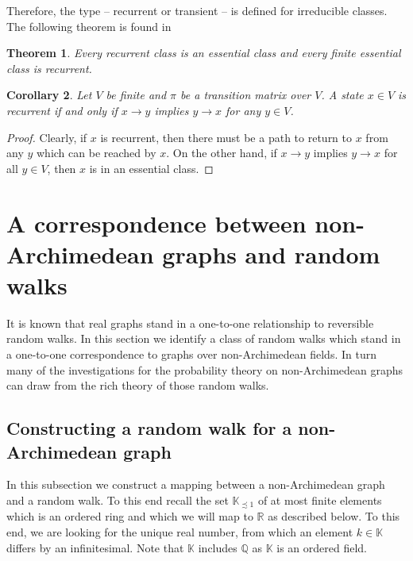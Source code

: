 \documentclass[a4paper,oneside, 12pt]{amsart}
\newtheorem{theorem}{Theorem}
\numberwithin{theorem}{section}
\newtheorem{corollary}[theorem]{Corollary}
\theoremstyle{definition}
\newcommand{\K}{\mathbb{K}}
\newcommand{\Kf}{\mathbb K_{\precsim 1}}
\newcommand{\prob}{\pi}
\begin{document}
{Therefore, the type -- recurrent or transient -- is defined for irreducible classes. The following theorem is found in \cite[3.4. Theorem (b) and (c)]{Woess09}

\begin{theorem}\label{lem:recvsess}
 Every
recurrent class is an essential class and 
every finite essential class is recurrent.
\end{theorem}



\begin{corollary}
Let  $ V $ be finite and $\prob$ be a transition matrix over $V$. A state $x\in V$  is recurrent if and only if  $x\to y$ implies $y\to x$ for any $y\in V$.
\end{corollary}
\begin{proof} Clearly, if $ x $	is recurrent, then there must be a path to return to $ x $ from any $ y $ which can be reached by $ x $. On the other hand,  if $x\to y$ implies $y\to x$ for all $ y\in V  $, then $x$ is in an essential class.
\end{proof}


\section{A correspondence between  non-Archimedean graphs and  random walks}\label{sec:Correspondence}
It is known that real graphs stand in a one-to-one relationship to reversible random walks. In this section we identify a class of random walks which stand in a one-to-one correspondence to graphs over non-Archimedean fields.  In turn many of the investigations for the probability theory on non-Archimedean graphs can draw from the rich theory of those random walks.

\subsection{Constructing a  random walk for a non-Archimedean graph}

In this subsection we construct a mapping between a non-Archimedean graph and a random walk. To this end recall the set $ \Kf $ of at most finite elements which is an ordered ring and which we will map to $ \mathbb{R} $ as described below. To this end, we are looking for the  unique real number, from which an element $ k\in\K $ differs by an infinitesimal. Note that $ \K $ includes $ \mathbb{Q} $ as $ \K $ is an ordered field.


}
\end{document}
